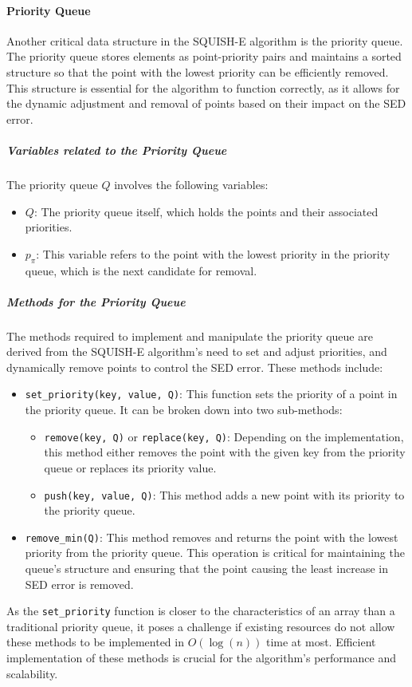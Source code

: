 \paragraph{Priority Queue}

Another critical data structure in the SQUISH-E algorithm is the priority queue. The priority queue stores elements as point-priority pairs and maintains a sorted structure so that the point with the lowest priority can be efficiently removed. This structure is essential for the algorithm to function correctly, as it allows for the dynamic adjustment and removal of points based on their impact on the SED error.

\subparagraph{Variables related to the Priority Queue}
The priority queue $Q$ involves the following variables:

\begin{itemize}
    \item \texttt{$Q$}: The priority queue itself, which holds the points and their associated priorities.
    \item \texttt{$p_{\pi}$}: This variable refers to the point with the lowest priority in the priority queue, which is the next candidate for removal.
\end{itemize}

\subparagraph{Methods for the Priority Queue}
The methods required to implement and manipulate the priority queue are derived from the SQUISH-E algorithm's need to set and adjust priorities, and dynamically remove points to control the SED error. These methods include:

\begin{itemize}
    \item \texttt{set\_priority(key, value, Q)}: This function sets the priority of a point in the priority queue. It can be broken down into two sub-methods:
    \begin{itemize}
        \item \texttt{remove(key, Q)} or \texttt{replace(key, Q)}: Depending on the implementation, this method either removes the point with the given key from the priority queue or replaces its priority value.
        \item \texttt{push(key, value, Q)}: This method adds a new point with its priority to the priority queue.
    \end{itemize}
    \item \texttt{remove\_min(Q)}: This method removes and returns the point with the lowest priority from the priority queue. This operation is critical for maintaining the queue's structure and ensuring that the point causing the least increase in SED error is removed.
\end{itemize}

As the \texttt{set\_priority} function is closer to the characteristics of an array than a traditional priority queue, it poses a challenge if existing resources do not allow these methods to be implemented in $O(\log(n))$ time at most. Efficient implementation of these methods is crucial for the algorithm's performance and scalability.




